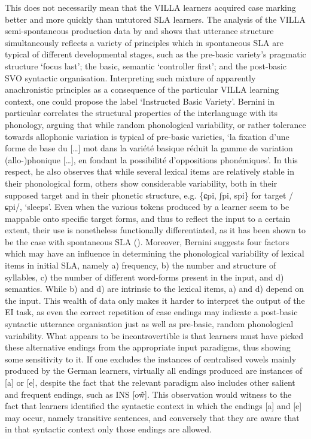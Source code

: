 This does not necessarily mean that the VILLA learners acquired case marking better and more quickly than untutored SLA learners. The analysis of the VILLA semi-spontaneous production data by \citet{Bernini2016} and \citet{Dimroth2018} shows that utterance structure simultaneously reflects a variety of principles which in spontaneous SLA are typical of different developmental stages, such as the pre-basic variety’s pragmatic structure ‘focus last’; the basic, semantic ‘controller first’; and the post-basic SVO syntactic organisation. Interpreting such mixture of apparently anachronistic principles as a consequence of the particular VILLA learning context, one could propose the label ‘Instructed Basic Variety’. Bernini in particular correlates the structural properties of the interlanguage with its phonology, arguing that while random phonological variability, or rather tolerance towards allophonic variation is typical of pre-basic varieties, ‘la fixation d’une forme de base du […] mot dans la variété basique réduit la gamme de variation (allo-)phonique […], en fondant la possibilité d’oppositions phonémiques’. In this respect, he also observes that while several lexical items are relatively stable in their phonological form, others show considerable variability, both in their supposed target and in their phonetic structure, e.g. \{ɕpi, ʃpi, spi\} for target /ɕpi/, ‘sleeps’. Even when the various tokens produced by a learner seem to be mappable onto specific target forms, and thus to reflect the input to a certain extent, their use is nonetheless functionally differentiated, as it has been shown to be the case with spontaneous SLA (\citealt{BroederEtAl1993}). Moreover, Bernini suggests four factors which may have an influence in determining the phonological variability of lexical items in initial SLA, namely a) frequency, b) the number and structure of syllables, c) the number of different word-forms present in the input, and d) semantics. While b) and d) are intrinsic to the lexical items, a) and d) depend on the input. This wealth of data only makes it harder to interpret the output of the EI task, as even the correct repetition of case endings may indicate a post-basic syntactic utterance organisation just as well as pre-basic, random phonological variability. What appears to be incontrovertible is that learners must have picked these alternative endings from the appropriate input paradigms, thus showing some sensitivity to it. If one excludes the instances of centralised vowels mainly produced by the German learners, virtually all endings produced are instances of [a] or [e], despite the fact that the relevant paradigm also includes other salient and frequent endings, such as INS [o\~{w}]. This observation would witness to the fact that learners identified the syntactic context in which the endings [a] and [e] may occur, namely transitive sentences, and conversely that they are aware that in that syntactic context only those endings are allowed.

